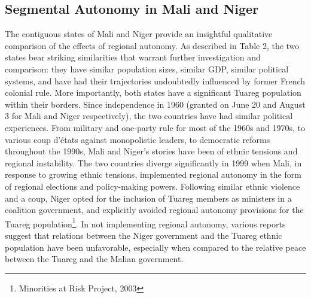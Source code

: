 \documentclass[12pt]{article}
\begin{document}
\subsection{Segmental Autonomy in Mali and Niger}
The contiguous states of Mali and Niger provide an insightful qualitative comparison of the effects of regional autonomy. As described in Table 2, the two states bear striking similarities that warrant further investigation and comparison: they have similar population sizes, similar GDP, similar political systems, and have had their trajectories undoubtedly influenced by former French colonial rule. More importantly, both states have a significant Tuareg population within their borders. Since independence in 1960 (granted on  June 20 and August 3 for Mali and Niger respectively), the two countries have had similar political experiences. From military and one-party rule for most of the 1960s and 1970s, to various coup d’états against monopolistic leaders, to democratic reforms throughout the 1990s, Mali and Niger's stories have been of ethnic tensions and regional instability. The two countries diverge significantly in 1999 when Mali, in response to growing ethnic tensions, implemented regional autonomy in the form of regional elections and policy-making powers. Following similar ethnic violence and a coup, Niger opted for the inclusion of Tuareg members as ministers in a coalition government, and explicitly avoided regional autonomy provisions for the Tuareg population\footnote{Minorities at Risk Project, 2003}. In not implementing regional autonomy, various reports suggest that relations between the Niger government and the Tuareg ethnic population have been unfavorable, especially when compared to the relative peace between the Tuareg and the Malian government. 

\begin{table}[ht]
\centering
\setlength{\tabcolsep}{10pt}
\renewcommand{\arraystretch}{1.5} 
\caption{Country Characteristics}
\end{table}
\end{document}
